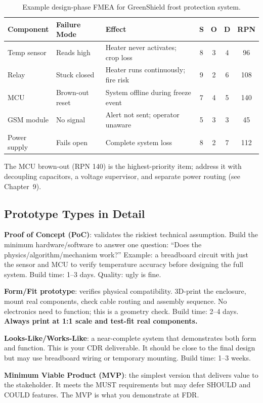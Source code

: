 \documentclass[11pt,letterpaper,twoside,openany]{book}
\begin{document}
\begin{table}[htbp]\centering\small
\begin{tabularx}{\textwidth}{l l X c c c c}
\toprule
\textbf{Component} & \textbf{Failure Mode} & \textbf{Effect} & \textbf{S} & \textbf{O} & \textbf{D} & \textbf{RPN} \\
\midrule
Temp sensor & Reads high & Heater never activates; crop loss & 8 & 3 & 4 & 96 \\
Relay & Stuck closed & Heater runs continuously; fire risk & 9 & 2 & 6 & 108 \\
MCU & Brown-out reset & System offline during freeze event & 7 & 4 & 5 & 140 \\
GSM module & No signal & Alert not sent; operator unaware & 5 & 3 & 3 & 45 \\
Power supply & Fails open & Complete system loss & 8 & 2 & 7 & 112 \\
\bottomrule
\end{tabularx}
\caption{Example design-phase FMEA for GreenShield frost protection system.}
\end{table}

The MCU brown-out (RPN 140) is the highest-priority item; address it with decoupling capacitors, a voltage supervisor, and separate power routing (see Chapter~9).


\subsection{Prototype Types in Detail}
\textbf{Proof of Concept (PoC)}: validates the riskiest technical assumption. Build the minimum hardware/software to answer one question: ``Does the physics/algorithm/mechanism work?'' Example: a breadboard circuit with just the sensor and MCU to verify temperature accuracy before designing the full system. Build time: 1--3 days. Quality: ugly is fine.

\textbf{Form/Fit prototype}: verifies physical compatibility. 3D-print the enclosure, mount real components, check cable routing and assembly sequence. No electronics need to function; this is a geometry check. Build time: 2--4 days. \textbf{Always print at 1:1 scale and test-fit real components.}

\textbf{Looks-Like/Works-Like}: a near-complete system that demonstrates both form and function. This is your CDR deliverable. It should be close to the final design but may use breadboard wiring or temporary mounting. Build time: 1--3 weeks.

\textbf{Minimum Viable Product (MVP)}: the simplest version that delivers value to the stakeholder. It meets the MUST requirements but may defer SHOULD and COULD features. The MVP is what you demonstrate at FDR.
\end{document}
